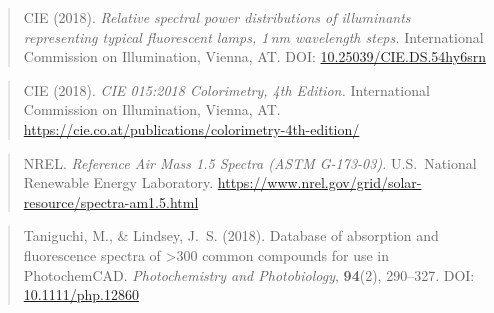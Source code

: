 \documentclass[11pt,a4paper]{article}
\begin{document}
\begin{quote}
CIE (2018). \emph{Relative spectral power distributions of
illuminants representing typical fluorescent lamps, 1\,nm wavelength
steps.} International Commission on Illumination, Vienna, AT.
DOI: \href{https://doi.org/10.25039/CIE.DS.54hy6srn}{10.25039/CIE.DS.54hy6srn}
\end{quote}

\begin{quote}
CIE (2018). \emph{CIE 015:2018 Colorimetry, 4th Edition.}
International Commission on Illumination, Vienna, AT.\\
\url{https://cie.co.at/publications/colorimetry-4th-edition/}
\end{quote}

\begin{quote}
NREL. \emph{Reference Air Mass 1.5 Spectra (ASTM G-173-03).} U.S.\
National Renewable Energy Laboratory.
\url{https://www.nrel.gov/grid/solar-resource/spectra-am1.5.html}
\end{quote}

\begin{quote}
Taniguchi, M., \& Lindsey, J.~S. (2018). Database of absorption and
fluorescence spectra of {>}300 common compounds for use in
PhotochemCAD. \emph{Photochemistry and Photobiology}, \textbf{94}(2),
290--327.
DOI: \href{https://doi.org/10.1111/php.12860}{10.1111/php.12860}
\end{quote}
\end{document}
